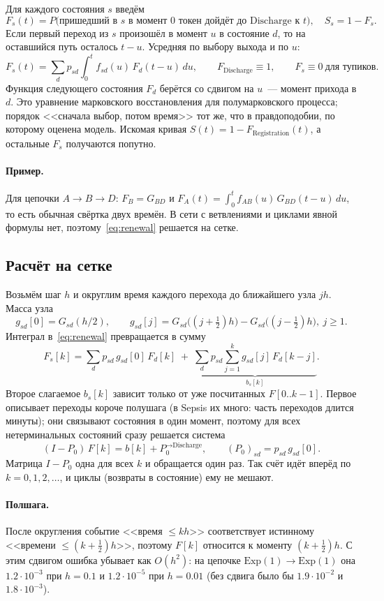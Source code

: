 \documentclass[11pt,a4paper]{article}
\begin{document}
Для каждого состояния $s$ введём
\[
F_s(t)=P\bigl(\text{пришедший в $s$ в момент 0 токен дойдёт до Discharge к $t$}\bigr),
\quad S_s=1-F_s.
\]
Если первый переход из $s$ произошёл в момент $u$ в состояние $d$, то на оставшийся путь
осталось $t-u$. Усредняя по выбору выхода и по $u$:
\begin{equation}\label{eq:renewal}
F_s(t)=\sum_d p_{sd}\int_0^t f_{sd}(u)\,F_d(t-u)\,du,\qquad
F_{\text{Discharge}}\equiv 1,\qquad F_s\equiv 0\ \text{для тупиков}.
\end{equation}
Функция следующего состояния $F_d$ берётся со сдвигом на $u$~--- момент прихода в $d$.
Это уравнение марковского восстановления для полумарковского процесса; порядок <<сначала выбор,
потом время>> тот же, что в правдоподобии, по которому оценена модель.
Искомая кривая $S(t)=1-F_{\text{Registration}}(t)$, а остальные $F_s$ получаются попутно.

\paragraph{Пример.} Для цепочки $A\to B\to D$: $F_B=G_{BD}$ и
$F_A(t)=\int_0^t f_{AB}(u)\,G_{BD}(t-u)\,du$, то есть обычная свёртка двух времён.
В сети с ветвлениями и циклами явной формулы нет, поэтому~\eqref{eq:renewal} решается на сетке.

\subsection{Расчёт на сетке}

Возьмём шаг $h$ и округлим время каждого перехода до ближайшего узла $jh$. Масса узла
\[
g_{sd}[0]=G_{sd}(h/2),\qquad g_{sd}[j]=G_{sd}\bigl((j+\tfrac12)h\bigr)-G_{sd}\bigl((j-\tfrac12)h\bigr),\ j\ge1.
\]
Интеграл в~\eqref{eq:renewal} превращается в сумму
\[
F_s[k]=\sum_d p_{sd}\,g_{sd}[0]\,F_d[k]\;+\;\underbrace{\sum_d p_{sd}\sum_{j=1}^{k}g_{sd}[j]\,F_d[k-j]}_{b_s[k]}.
\]
Второе слагаемое $b_s[k]$ зависит только от уже посчитанных $F[0..k-1]$. Первое описывает
переходы короче полушага (в Sepsis их много: часть переходов длится минуты); они связывают
состояния в один момент, поэтому для всех нетерминальных состояний сразу решается система
\[
(I-P_0)\,F[k]=b[k]+P_0^{\to\text{Discharge}},\qquad (P_0)_{sd}=p_{sd}\,g_{sd}[0].
\]
Матрица $I-P_0$ одна для всех $k$ и обращается один раз. Так счёт идёт вперёд по
$k=0,1,2,\dots$, и циклы (возвраты в состояние) ему не мешают.

\paragraph{Полшага.} После округления событие <<время $\le kh$>> соответствует истинному
<<времени $\le (k+\frac12)h$>>, поэтому $F[k]$ относится к моменту $(k+\frac12)h$. С этим сдвигом
ошибка убывает как $O(h^2)$: на цепочке $\mathrm{Exp}(1)\to\mathrm{Exp}(1)$ она $1.2\cdot10^{-3}$
при $h=0.1$ и $1.2\cdot10^{-5}$ при $h=0.01$ (без сдвига было бы $1.9\cdot10^{-2}$ и $1.8\cdot10^{-3}$).
\end{document}
